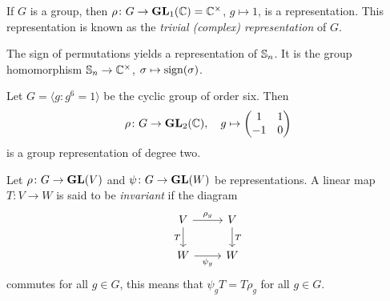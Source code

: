 \begin{example}
	If $G$ is a group, then $\rho\colon G\to\mathbf{GL}_1(\mathbb{C})=\mathbb{C}^\times$, $g\mapsto 1$, 
	is a representation. This representation is known as the \emph{trivial (complex) representation} of $G$. 	
\end{example}

\begin{example}
	The sign of permutations yields a representation of $\mathbb{S}_n$. It is the group homomorphism
	$\mathbb{S}_n\to\mathbb{C}^\times$, $\sigma\mapsto\operatorname{sign}(\sigma)$.  	
\end{example}

\begin{example}
	Let $G=\langle g:g^6=1\rangle$ be the cyclic group of order six. Then
	\[
	\rho\colon G\to\mathbf{GL}_2(\mathbb{C}),
	\quad 
	g\mapsto\begin{pmatrix}1&1\\-1&0\end{pmatrix}
	\] 
	is a group representation of degree two. 
\end{example}

%
%
%
%
\begin{definition}
    Let $\rho\colon G\to\mathbf{GL}(V)$ and $\psi\colon G\to\mathbf{GL}(W)$ be
    representations. A linear map $T\colon V\to W$ is said to be \emph{invariant} 
    if the diagram
    \[\begin{tikzcd}
	V & V \\
	W & W
	\arrow["{\rho_g}", from=1-1, to=1-2]
	\arrow["T"', from=1-1, to=2-1]
	\arrow["{\psi_g}"', from=2-1, to=2-2]
	\arrow["T", from=1-2, to=2-2]
\end{tikzcd}
\]
    commutes for all $g\in G$, this means that 
    $\psi_gT=T\rho_g$ for all $g\in G$.
\end{definition}

